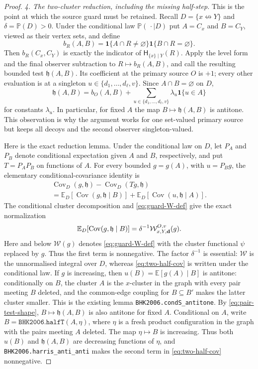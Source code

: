 \documentclass[11pt]{article}
\theoremstyle{definition}
\theoremstyle{remark}
\newcommand{\PP}{\mathbb P}
\newcommand{\EE}{\mathbb E}
\newcommand{\one}{\mathbf 1}
\newcommand{\ncon}{\not\leftrightarrow}
\newcommand{\lean}[1]{\texttt{#1}}
\begin{document}
\begin{proof}
\emph{4. The two-cluster reduction, including the missing half-step.}
This is the point at which the source guard must be retained.  Recall
$D=\{x\ncon Y\}$ and $\delta=\PP(D)>0$.  Under the conditional law
$\PP(\,\cdot\mid D)$ put $A=C_x$ and $B=C_Y$, viewed as their vertex
sets, and define
\[
 b_R(A,B)=\one\{A\cap R\ne\varnothing\}\one\{B\cap R=\varnothing\}.
\]
Then $b_R(C_x,C_Y)$ is exactly the indicator of
$\mathsf H_{\{x\}\mid Y}(R)$.  Apply the level form and the final observer
subtraction to $R\mapsto b_R(A,B)$, and call the resulting bounded test
$\mathfrak h(A,B)$.  Its coefficient at the primary source $O$ is $+1$;
every other evaluation is at a singleton $u\in\{d_1,\ldots,d_\ell,v\}$.
Since $A\cap B=\varnothing$ on $D$,
\begin{equation}\label{eq:pair-test-shape}
 \mathfrak h(A,B)=b_O(A,B)+
   \sum_{u\in\{d_1,\ldots,d_\ell,v\}}\lambda_u\one\{u\in A\}
\end{equation}
for constants $\lambda_u$.  In particular, for fixed $A$ the map
$B\mapsto\mathfrak h(A,B)$ is antitone.  This observation is why the
argument works for one set-valued primary source but keeps all decoys and
the second observer singleton-valued.

Here is the exact reduction lemma.  Under the conditional law on $D$, let
$P_A$ and $P_B$ denote conditional expectation given $A$ and $B$,
respectively, and put $T=P_A P_B$ on functions of $A$.  For every bounded
$g=g(A)$, with $u=P_B g$, the elementary conditional-covariance identity is
\begin{multline}\label{eq:two-half-cov}
 \operatorname{Cov}_D(g,\mathfrak h)
 -\operatorname{Cov}_D(Tg,\mathfrak h)\\
 =\EE_D[\operatorname{Cov}(g,\mathfrak h\mid B)]
  +\EE_D[\operatorname{Cov}(u,\mathfrak h\mid A)].
\end{multline}
The conditional cluster decomposition and \eqref{eq:guard-W-def} give
the exact normalization
\[
 \EE_D[\operatorname{Cov}(g,\mathfrak h\mid B)]
 =\delta^{-1}\mathcal W_{x,Y,{\bf d}}^{O,v}(g).
\]
Here and below $\mathcal W(g)$ denotes \eqref{eq:guard-W-def} with the
cluster functional $\psi$ replaced by $g$.
Thus the first term is nonnegative.  The factor $\delta^{-1}$ is
essential: $\mathcal W$ is the unnormalised integral over $D$, whereas
\eqref{eq:two-half-cov} is written under the conditional law.  If $g$ is
increasing, then
$u(B)=\EE[g(A)\mid B]$ is antitone: conditionally on $B$, the cluster
$A$ is the $x$-cluster in the graph with every pair meeting $B$ deleted,
and the common-edge coupling for $B\subseteq B'$ makes the latter cluster
smaller.  This is the existing lemma \lean{BHK2006.condS\_antitone}.
By \eqref{eq:pair-test-shape}, $B\mapsto\mathfrak h(A,B)$ is also
antitone for fixed $A$.  Conditional on $A$, write
$B=\lean{BHK2006.halfT}(A,\eta)$, where $\eta$ is a fresh product
configuration in the graph with the pairs meeting $A$ deleted.  The map
$\eta\mapsto B$ is increasing.  Thus both
$u(B)$ and $\mathfrak h(A,B)$ are decreasing functions of $\eta$, and
\lean{BHK2006.harris\_anti\_anti} makes the second term in
\eqref{eq:two-half-cov} nonnegative.


\end{proof}
\end{document}
